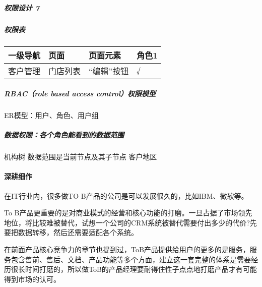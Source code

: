 \documentclass[letterpaper,11pt,english]{sphinxmanual}
\begin{document}
\subparagraph{权限设计 7\sphinxfootnotemark[21]}
\label{\detokenize{chapter_introduction/2B:id14}}%
\begin{footnotetext}[21]\sphinxAtStartFootnote
{}
%
\end{footnotetext}\ignorespaces 

\subparagraph{权限表}
\label{\detokenize{chapter_introduction/2B:id15}}

\begin{savenotes}\sphinxattablestart
\centering
\begin{tabulary}{\linewidth}[t]{|T|T|T|T|}
\hline
\sphinxstyletheadfamily 
一级导航
&\sphinxstyletheadfamily 
页面
&\sphinxstyletheadfamily 
页面元素
&\sphinxstyletheadfamily 
角色1
\\
\hline
客户管理
&
门店列表
&
“编辑”按钮
&
√
\\
\hline
\end{tabulary}
\par
\sphinxattableend\end{savenotes}


\subparagraph{RBAC（role based access control）权限模型}
\label{\detokenize{chapter_introduction/2B:rbac-role-based-access-control}}
ER模型：用户、角色、用户组


\subparagraph{数据权限：各个角色能看到的数据范围}
\label{\detokenize{chapter_introduction/2B:id16}}
机构树 数据范围是当前节点及其子节点 客户地区


\paragraph{深耕细作}
\label{\detokenize{chapter_introduction/2B:id17}}
在IT行业内，很多做TO
B产品的公司是可以发展很久的，比如IBM、微软等。%
\begin{footnote}[22]\sphinxAtStartFootnote
{}
%
\end{footnote}

To
B产品更重要的是对商业模式的经营和核心功能的打磨。一旦占据了市场领先地位，将比较难被替代，试想一个公司的CRM系统被替代需要付出多少的代价?先要把数据转移，然后还需要适配各个系统。

在前面产品核心竞争力的章节也提到过，ToB产品提供给用户的更多的是服务，服务包含售前、售后、文档、产品功能等多个方面，建立这一套完整的体系是需要经历很长时间打磨的，所以做ToB的产品经理要耐得住性子点点地打磨产品才有可能得到市场的认可。
\end{document}
